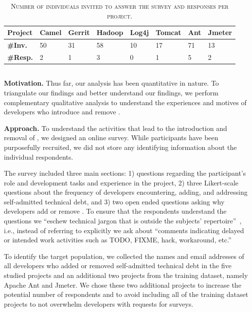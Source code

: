 \begin{table}[t]
	\centering
	\caption{\textsc{Number of individuals invited to answer the survey and responses per project.}}
	\label{Number_of_the_Survey_Responses_per_Project}
	\begin{tabular}{@{}p{0.9cm}p{0.7cm}p{0.7cm}p{0.7cm}p{0.7cm}p{0.7cm}p{0.7cm}p{0.7cm}@{}}
		\toprule
		\textbf{Project}&Camel&Gerrit&Hadoop&Log4j&Tomcat&Ant&Jmeter\\ \midrule
		\textbf{\#Inv.} & 50 & 31 & 58 & 10 & 17 & 71 & 13  \\ \midrule
		\textbf{\#Resp.} & 2 & 1 & 3 & 0 & 1 & 5 & 2  \\ \bottomrule
	\end{tabular}
\end{table}

\subsection*{\rqiv}


\noindent\textbf{Motivation.} Thus far, our analysis has been quantitative in nature. To triangulate our findings and better understand our findings, we perform complementary qualitative analysis to understand the experiences and motives of developers who introduce and remove \SATD.

 
\noindent\textbf{Approach.} 
To understand the activities that lead to the introduction and removal of \SATD, we designed an online survey. 
While participants have been purposefully recruited, we did not store any identifying information  about the individual respondents.

The survey included three main sections: 1)  questions regarding the participant's role and development tasks and experience in the project, 2) three Likert-scale questions about the frequency of developers encountering, adding, and addressing self-admitted technical debt, and 3) two open ended questions asking why developers add or remove \SATD. To ensure that the respondents understand the questions we ``eschew technical jargon that is outside the subjects’ repertoire''~\cite{SingerVinson}, i.e., instead of referring to \SATD explicitly we ask about ``comments indicating delayed or intended work activities such as TODO, FIXME, hack, workaround, etc.''

To identify the target population, we collected the names and email addresses of all developers who added or removed self-admitted technical debt in the five studied projects and an additional two projects from the training dataset, namely Apache Ant and Jmeter. We chose these two additional projects to increase the potential number of respondents and to avoid including all of the training dataset projects to not overwhelm developers with requests for surveys.

